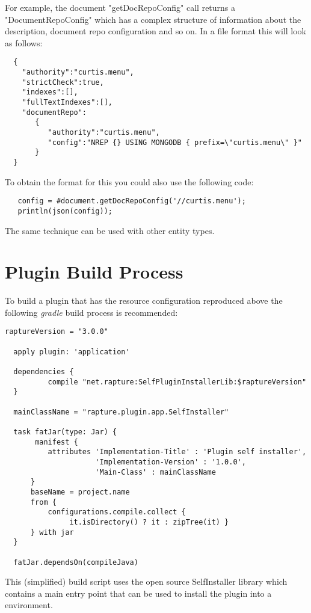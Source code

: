 For example, the document "getDocRepoConfig" call returns a "DocumentRepoConfig" which has a complex structure of
information about the description, document repo configuration and so on. In a file format this will look as follows:

\begin{Verbatim}
  {
    "authority":"curtis.menu",
    "strictCheck":true,
    "indexes":[],
    "fullTextIndexes":[],
    "documentRepo":
       {
          "authority":"curtis.menu",
          "config":"NREP {} USING MONGODB { prefix=\"curtis.menu\" }"
       }
  }
\end{Verbatim}

To obtain the format for this you could also use the following \Reflex code:

\begin{Verbatim}
   config = #document.getDocRepoConfig('//curtis.menu');
   println(json(config));
\end{Verbatim}

The same technique can be used with other entity types.

\section{Plugin Build Process}
To build a plugin that has the resource configuration reproduced above the following
\emph{gradle} build process is recommended:

\begin{Verbatim}[fontsize=\footnotesize]
  raptureVersion = "3.0.0"

  apply plugin: 'application'

  dependencies {
          compile "net.rapture:SelfPluginInstallerLib:$raptureVersion"
  }

  mainClassName = "rapture.plugin.app.SelfInstaller"

  task fatJar(type: Jar) {
       manifest {
          attributes 'Implementation-Title' : 'Plugin self installer',
                     'Implementation-Version' : '1.0.0',
                     'Main-Class' : mainClassName
      }
      baseName = project.name
      from {
          configurations.compile.collect {
               it.isDirectory() ? it : zipTree(it) }
      } with jar
  }

  fatJar.dependsOn(compileJava)

\end{Verbatim}

This (simplified) build script uses the \Rapture open source SelfInstaller library which contains
a main entry point that can be used to install the plugin into a \Rapture environment.

